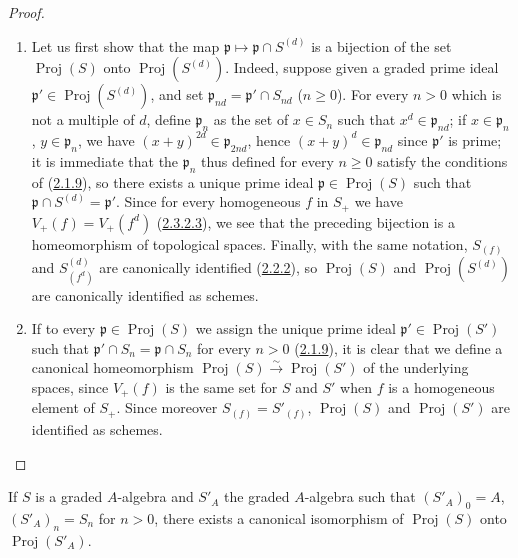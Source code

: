 \begin{proof}
\begin{enumerate}
  \item[\rm(i)] Let us first show that the map
    $\mathfrak{p}\mapsto\mathfrak{p}\cap S^{(d)}$ is a bijection of
    the set $\operatorname{Proj}(S)$ onto
    $\operatorname{Proj}(S^{(d)})$. Indeed, suppose given a graded
    prime ideal $\mathfrak{p}'\in\operatorname{Proj}(S^{(d)})$, and set
    $\mathfrak{p}_{nd}=\mathfrak{p}'\cap S_{nd}$ ($n\geq0$). For every
    $n>0$ which is not a multiple of $d$, define $\mathfrak{p}_n$ as
    the set of $x\in S_n$ such that
    $x^d\in\mathfrak{p}_{nd}$; if $x\in\mathfrak{p}_n$,
    $y\in\mathfrak{p}_n$, we have
    $(x+y)^{2d}\in\mathfrak{p}_{2nd}$, hence
    $(x+y)^d\in\mathfrak{p}_{nd}$ since $\mathfrak{p}'$ is prime; it
    is immediate that the $\mathfrak{p}_n$ thus defined for every $n\geq0$
    satisfy the conditions of
    (\hyperref[II.2.1.9]{2.1.9}), so there exists a unique prime ideal
    $\mathfrak{p}\in\operatorname{Proj}(S)$ such that
    $\mathfrak{p}\cap S^{(d)}=\mathfrak{p}'$. Since for every homogeneous
    $f$ in $S_+$ we have
    $V_+(f)=V_+(f^d)$ (\hyperref[II.2.3.2.3]{2.3.2.3}), we see that the
    preceding bijection is a homeomorphism of topological spaces.
    Finally, with the same notation, $S_{(f)}$ and
    $S^{(d)}_{(f^d)}$ are canonically identified
    (\hyperref[II.2.2.2]{2.2.2}), so $\operatorname{Proj}(S)$ and
    $\operatorname{Proj}(S^{(d)})$ are canonically identified as
    schemes.
  \item[\rm(ii)] If to every
    $\mathfrak{p}\in\operatorname{Proj}(S)$ we assign the unique
    prime ideal $\mathfrak{p}'\in\operatorname{Proj}(S')$ such that
    $\mathfrak{p}'\cap S_n=\mathfrak{p}\cap S_n$ for every $n>0$
    (\hyperref[II.2.1.9]{2.1.9}), it is clear that we define a
    canonical homeomorphism
    $\operatorname{Proj}(S)\xrightarrow{\sim}\operatorname{Proj}(S')$ of the
    underlying spaces, since $V_+(f)$ is the same set for $S$ and
    $S'$ when $f$ is a homogeneous element of $S_+$. Since moreover
    $S_{(f)}=S'_{(f)}$, $\operatorname{Proj}(S)$ and
    $\operatorname{Proj}(S')$ are identified as schemes.
\end{enumerate}
\end{proof}

\begin{corollary}[2.4.8]
\label{II.2.4.8}
If $S$ is a graded $A$-algebra and $S'_A$ the graded $A$-algebra such that
$(S'_A)_0=A$, $(S'_A)_n=S_n$ for $n>0$, there exists a canonical isomorphism
of $\operatorname{Proj}(S)$ onto $\operatorname{Proj}(S'_A)$.
\end{corollary}


